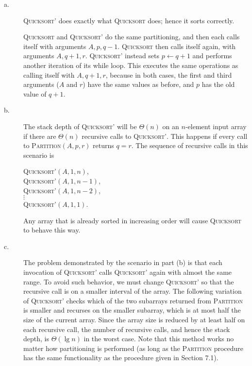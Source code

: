 \documentclass[a4paper,10pt]{article}
\begin{document}
\begin{description}
  
\item[a. \hspace{9pt}] \textsc{Quicksort'} does exactly what \textsc{Quicksort} does; hence it sorts correctly.


\textsc{Quicksort} and \textsc{Quicksort'} do the same partitioning, and then each calls itself with arguments
$A, p, q − 1$. \textsc{Quicksort} then calls itself again, with arguments $A, q + 1, r$. \textsc{Quicksort'} instead
sets $p \leftarrow q + 1$ and performs another iteration of its while loop. This executes the same operations as
calling itself with $A, q + 1, r$, because in both cases, the first and third arguments ($A$ and $r$) have the same
values as before, and $p$ has the old value of $q + 1$.


\item[b. \hspace{9pt}] The stack depth of \textsc{Quicksort'} will be $\Theta(n)$ on an $n$-element input array if
there are $\Theta(n)$ recursive calls to \textsc{Quicksort'}. This happens if every call to \textsc{Partition}$(A, p, r)$
returns $q=r$. The sequence of recursive calls in this scenario is 

\textsc{Quicksort'}$(A, 1, n)$, \\
\textsc{Quicksort'}$(A, 1, n - 1)$, \\
\textsc{Quicksort'}$(A, 1, n -2 )$, \\
  $\vdots$\\
\textsc{Quicksort'}$(A, 1, 1)$.

Any array that is already sorted in increasing order will cause \textsc{Quicksort} to behave this way.


\item[c. \hspace{9pt}] The problem demonstrated by the scenario in part (b) is that each invocation
of \textsc{Quicksort'} calls \textsc{Quicksort'} again with almost the same range. To avoid such behavior,
we must change \textsc{Quicksort'} so that the recursive call is on a smaller interval of the array.
The following variation of \textsc{Quicksort'} checks which of the two subarrays returned from \textsc{Partition}
 is smaller and recurses on the smaller subarray, which is at most half the size of the current array.
 Since the array size is reduced by at least half on each recursive call, the number of recursive calls,
 and hence the stack depth, is $\Theta(\lg n)$ in the worst case. Note that this method works no matter how
 partitioning is performed (as long as the \textsc{Partition} procedure has the same functionality as the procedure
 given in Section 7.1).
 

\end{description}
\end{document}

